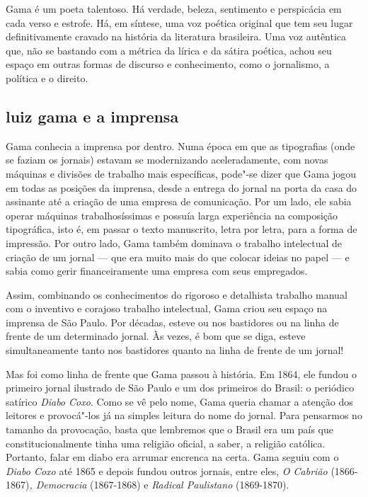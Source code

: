 Gama é um poeta talentoso. Há verdade, beleza, sentimento e perspicácia
em cada verso e estrofe. Há, em síntese, uma voz poética original que
tem seu lugar definitivamente cravado na história da literatura
brasileira. Uma voz autêntica que, não se bastando com a métrica da
lírica e da sátira poética, achou seu espaço em outras formas de
discurso e conhecimento, como o jornalismo, a política e o direito.

\subsection{luiz gama e a imprensa}

Gama conhecia a imprensa por dentro. Numa época em que as tipografias
(onde se faziam os jornais) estavam se modernizando aceleradamente, com
novas máquinas e divisões de trabalho mais específicas, pode"-se dizer
que Gama jogou em todas as posições da imprensa, desde a entrega do
jornal na porta da casa do assinante até a criação de uma empresa de
comunicação. Por um lado, ele sabia operar máquinas trabalhosíssimas e
possuía larga experiência na composição tipográfica, isto é, em passar o
texto manuscrito, letra por letra, para a forma de impressão. Por outro
lado, Gama também dominava o trabalho intelectual de criação de um
jornal --- que era muito mais do que colocar ideias no papel --- e sabia
como gerir financeiramente uma empresa com seus empregados.

Assim, combinando os conhecimentos do rigoroso e detalhista trabalho
manual com o inventivo e corajoso trabalho intelectual, Gama criou seu
espaço na imprensa de São Paulo. Por décadas, esteve ou nos bastidores
ou na linha de frente de um determinado jornal. Às vezes, é bom que se
diga, esteve simultaneamente tanto nos bastidores quanto na linha de
frente de um jornal!

Mas foi como linha de frente que Gama passou à história. Em 1864, ele
fundou o primeiro jornal ilustrado de São Paulo e um dos primeiros do
Brasil: o periódico satírico \emph{Diabo Coxo}. Como se vê pelo nome,
Gama queria chamar a atenção dos leitores e provocá"-los já na simples
leitura do nome do jornal. Para pensarmos no tamanho da provocação,
basta que lembremos que o Brasil era um país que constitucionalmente
tinha uma religião oficial, a saber, a religião católica. Portanto,
falar em diabo era arrumar encrenca na certa. Gama seguiu com o
\emph{Diabo Coxo} até 1865 e depois fundou outros jornais, entre eles,
\emph{O Cabrião} (1866-1867)\emph{, Democracia} (1867-1868) e
\emph{Radical Paulistano} (1869-1870).

